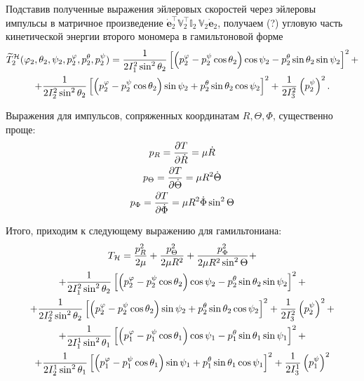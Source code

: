 \documentclass[14pt]{extarticle}
\newcommand{\dveulers}{\dot{\mathbf{e}}_2}
\newcommand{\dR}{\dot{R}}
\newcommand{\dTheta}{\dot{\Theta}}
\newcommand{\dPhi}{\dot{\Phi}}
\newcommand{\bbVs}{\mathbb{V}_2}
\newcommand{\bbIt}{\mathbb{I}_2 \,}
\newcommand{\If}{I_1^2}
\newcommand{\Is}{I_2^2}
\newcommand{\It}{I_3^2}
\newcommand{\Iff}{I_1^1}
\newcommand{\Iss}{I_2^1}
\newcommand{\Itt}{I_3^1}
\newcommand{\lb}{\left(}
\newcommand{\rb}{\right)}
\newcommand{\lsq}{\left[}
\newcommand{\rsq}{\right]}
\begin{document}
Подставив полученные выражения эйлеровых скоростей через эйлеровы импульсы в матричное произведение $\displaystyle \dveulers^\top \bbVs^\top \bbIt \bbVs \dveulers$, получаем (?) угловую часть кинетической энергии второго мономера в гамильтоновой форме
\begin{gather}
		\widetilde{T}_2^\mathcal{H} (\varphi_2, \theta_2, \psi_2, p_2^\varphi, p_2^\theta, p_2^\psi)= \frac{1}{2 \If \sin^2 \theta_2} \lsq \lb p_2^\varphi - p_2^\psi \cos \theta_2 \rb \cos \psi_2 - p_2^\theta \sin \theta_2 \sin \psi_2 \rsq^2 + \notag \\
	+ \frac{1}{2 \Is \sin^2 \theta_2} \lsq \lb p_2^\varphi - p_2^\psi \cos \theta_2 \rb \sin \psi_2 + p_2^\theta \sin \theta_2 \cos \psi_2 \rsq^2 + \frac{1}{2 \It} \lb p_2^\psi \rb^2.
\end{gather}

Выражения для импульсов, сопряженных координатам $R, \Theta, \Phi$, существенно проще:
\begin{gather}
	p_R = \frac{\partial T}{\partial \dR} = \mu \dR \notag \\
	p_\Theta = \frac{\partial T}{\partial \dTheta} = \mu R^2 \dTheta \notag \\
	p_\Phi = \frac{\partial T}{\partial \dPhi} = \mu R^2 \dPhi \sin^2 \Theta \notag
\end{gather}

Итого, приходим к следующему выражению для гамильтониана:
\begin{gather}
	T_\mathcal{H} = \frac{p_R^2}{2 \mu} + \frac{p_\Theta^2}{2 \mu R^2} + \frac{p_\Phi^2}{2 \mu R^2 \sin^2 \Theta} + \notag \\
	+ \frac{1}{2 \If \sin^2 \theta_2} \lsq \lb p_2^\varphi - p_2^\psi \cos \theta_2 \rb \cos \psi_2 - p_2^\theta \sin \theta_2 \sin \psi_2 \rsq^2 + \notag \\
	+ \frac{1}{2 \Is \sin^2 \theta_2} \lsq \lb p_2^\varphi - p_2^\psi \cos \theta_2 \rb \sin \psi_2 + p_2^\theta \sin \theta_2 \cos \psi_2 \rsq^2 + \frac{1}{2 \It} \lb p_2^\psi \rb^2 + \notag \\
	+ \frac{1}{2 \Iff \sin^2 \theta_1} \lsq \lb p_1^\varphi - p_1^\psi \cos \theta_1 \rb \cos \psi_1 - p_1^\theta \sin \theta_1 \sin \psi_1 \rsq^2 + \notag \\
	+ \frac{1}{2 \Iss \sin^2 \theta_1} \lsq \lb p_1^\varphi - p_1^\psi \cos \theta_1 \rb \sin \psi_1 + p_1^\theta \sin \theta_1 \cos \psi_1 \rsq^2 + \frac{1}{2 \Itt} \lb p_1^\psi \rb^2 \notag
\end{gather}
\end{document}
